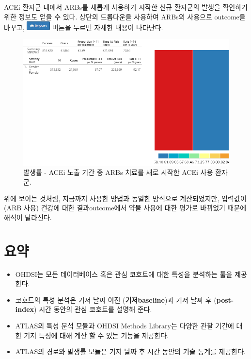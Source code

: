 \documentclass[10.5pt]{book}
\theoremstyle{definition}
\theoremstyle{definition}
\theoremstyle{definition}
\theoremstyle{remark}
\let\BeginKnitrBlock\begin \let\EndKnitrBlock\end
\begin{document}
ACEi 환자군 내에서 ARBs를 새롭게 사용하기 시작한 신규 환자군의 발생을
확인하기 위한 정보도 얻을 수 있다. 상단의 드롭다운을 사용하여 ARBs의
사용으로 outcome을 바꾸고,
\includegraphics{images/Characterization/atlasIncidenceReportButton.png}
버튼을 누르면 자세한 내용이 나타난다.

\begin{figure}

{\centering \includegraphics[width=1\linewidth]{images/Characterization/atlasIncidenceResultsARB} 

}

\caption{발생률 - ACEi 노출 기간 중 ARBs 치료를 새로 시작한 ACEi 사용 환자군.}\label{fig:atlasIncidenceResultsARB}
\end{figure}

위에 보이는 것처럼, 지금까지 사용한 방법과 동일한 방식으로 계산되었지만,
입력값이 (ARB 사용) 건강에 대한 결과outcome에서 약물 사용에 대한 평가로
바뀌었기 때문에 해석이 달라진다.

\section{요약}\label{-9}

\BeginKnitrBlock{rmdsummary}
\begin{itemize}
\item
  OHDSI는 모든 데이터베이스 혹은 관심 코호트에 대한 특성을 분석하는 툴을
  제공한다.
\item
  코호트의 특성 분석은 기저 날짜 이전 (\textbf{기저baseline})과 기저
  날짜 후 (\textbf{post-index}) 시간 동안의 관심 코호트를 설명해 준다.
\item
  ATLAS의 특성 분석 모듈과 OHDSI Methods Library는 다양한 관찰 기간에
  대한 기저 특성에 대해 계산 할 수 있는 기능을 제공한다.
\item
  ATLAS의 경로와 발생률 모듈은 기저 날짜 후 시간 동안의 기술 통계를
  제공한다.
\end{itemize}
\EndKnitrBlock{rmdsummary}
\end{document}
